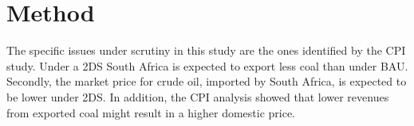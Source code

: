 \documentclass[12pt,english]{article}
\begin{document}


\section{Method}

The specific issues under scrutiny in this study are the ones identified by the CPI study. Under a 2DS South Africa is expected to export less coal than under BAU. Secondly, the market price for crude oil, imported by South Africa, is expected to be lower under 2DS. In addition, the CPI analysis showed that lower revenues from exported coal might result in a higher domestic price. %

\end{document}
